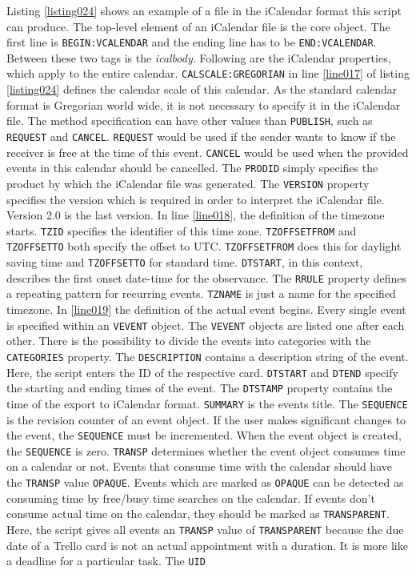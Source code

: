 Listing \ref{listing024} shows an example of a file in the iCalendar format this script can produce. The top-level element of an iCalendar file is the core object. The first line is \lstinline{BEGIN:VCALENDAR} and the ending line has to be \lstinline{END:VCALENDAR}. Between these two tags is the \emph{icalbody}. Following are the iCalendar properties, which apply to the entire calendar. \lstinline{CALSCALE:GREGORIAN} in line \ref{line017} of listing \ref{listing024} defines the calendar scale of this calendar. As the standard calendar format is Gregorian world wide, it is not necessary to specify it in the iCalendar file. The method specification can have other values than \lstinline{PUBLISH}, such as \lstinline{REQUEST} and \lstinline{CANCEL}. \lstinline{REQUEST} would be used if the sender wants to know if the receiver is free at the time of this event. \lstinline{CANCEL} would be used when the provided events in this calendar should be cancelled. The \lstinline{PRODID} simply specifies the product by which the iCalendar file was generated. The \lstinline{VERSION} property specifies the version which is required in order to interpret the iCalendar file. Version 2.0 is the last version. In line \ref{line018}, the definition of the timezone starts. \lstinline{TZID} specifies the identifier of this time zone. \lstinline{TZOFFSETFROM} and \lstinline{TZOFFSETTO} both specify the offset to UTC. \lstinline{TZOFFSETFROM} does this for daylight saving time and \lstinline{TZOFFSETTO} for standard time. \lstinline{DTSTART}, in this context, describes the first onset date-time for the observance. The \lstinline{RRULE} property defines a repeating pattern for recurring events. \lstinline{TZNAME} is just a name for the specified timezone. In \ref{line019} the definition of the actual event begins. Every single event is specified within an \lstinline{VEVENT} object. The \lstinline{VEVENT} objects are listed one after each other. There is the possibility to divide the events into categories with the \lstinline{CATEGORIES} property. The \lstinline{DESCRIPTION} contains a description string of the event. Here, the script enters the ID of the respective card. \lstinline{DTSTART} and \lstinline{DTEND} specify the starting and ending times of the event. The \lstinline{DTSTAMP} property contains the time of the export to iCalendar format. \lstinline{SUMMARY} is the events title. The \lstinline{SEQUENCE} is the revision counter of an event object. If the user makes significant changes to the event, the \lstinline{SEQUENCE} must be incremented. When the event object is created, the \lstinline{SEQUENCE} is zero. \lstinline{TRANSP} determines whether the event object consumes time on a calendar or not. Events that consume time with the calendar should have the \lstinline{TRANSP} value \lstinline{OPAQUE}. Events which are marked as \lstinline{OPAQUE} can be detected as consuming time by free/busy time searches on the calendar. If events don't consume actual time on the calendar, they should be marked as \lstinline{TRANSPARENT}. Here, the script gives all events an \lstinline{TRANSP} value of \lstinline{TRANSPARENT} because the due date of a Trello card is not an actual appointment with a duration. It is more like a deadline for a particular task. The \lstinline{UID} 